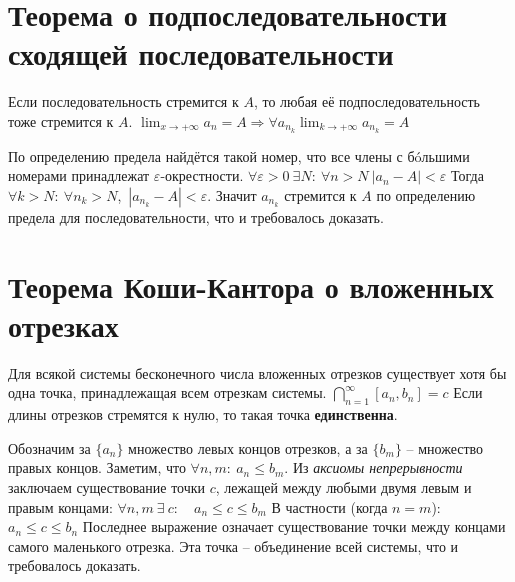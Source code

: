 \section{Теорема о подпоследовательности сходящей последовательности}
\begin{theorem}
Если последовательность стремится к $A$, то любая её подпоследовательность тоже стремится к $A$.\newline
$\displaystyle \lim_{x \to +\infty} a_n = A \Rightarrow \forall a_{n_k} \lim_{k \to +\infty} a_{n_k} = A$
\end{theorem}
По определению предела найдётся такой номер, что все члены с б\'oльшими номерами принадлежат $\varepsilon$-окрестности.
$\forall \varepsilon > 0\ \exists N:\ \forall n > N\ |a_n - A| < \varepsilon$\newline
Тогда $\forall k > N:\ \forall n_k > N$,\  $|a_{n_k} - A| < \varepsilon$.\newline
Значит $a_{n_k}$ стремится к $A$ по определению предела для последовательности, что и требовалось доказать.  

\section[Т. о влож. отрезках]{Теорема Коши-Кантора о вложенных отрезках}
\begin{theorem}
Для всякой системы бесконечного числа вложенных отрезков существует хотя бы одна точка, принадлежащая всем отрезкам системы.\newline
$\bigcap\limits_{n=1}^{\infty} [a_n, b_n] = c$\newline
Если длины отрезков стремятся к нулю, то такая точка \textbf{единственна}.
\end{theorem}
Обозначим за $\{ a_n\}$ множество левых концов отрезков, а за $\{ b_m \}$ -- множество правых концов.
Заметим, что $\forall n, m:\ a_n \leq b_m$. Из \textit{аксиомы непрерывности} заключаем существование точки $c$, лежащей между любыми двумя левым и правым концами:\newline
$\forall n, m\ \exists\  c: \quad a_n \leq c \leq b_m$\newline
В частности (когда $n = m$): $a_n \leq c \leq b_n$\newline 
Последнее выражение означает существование точки между концами самого маленького отрезка. Эта точка -- объединение всей системы, что и требовалось доказать.\newline\newline

